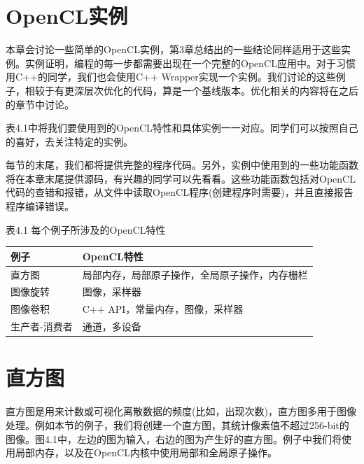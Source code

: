 

\section{OpenCL实例}

本章会讨论一些简单的OpenCL实例，第3章总结出的一些结论同样适用于这些实例。实例证明，编程的每一步都需要出现在一个完整的OpenCL应用中。对于习惯用C++的同学，我们也会使用C++ Wrapper实现一个实例。我们讨论的这些例子，相较于有更深层次优化的代码，算是一个基线版本。优化相关的内容将在之后的章节中讨论。

表4.1中将我们要使用到的OpenCL特性和具体实例一一对应。同学们可以按照自己的喜好，去关注特定的实例。

每节的末尾，我们都将提供完整的程序代码。另外，实例中使用到的一些功能函数将在本章末尾提供源码，有兴趣的同学可以先看看。这些功能函数包括对OpenCL代码的查错和报错，从文件中读取OpenCL程序(创建程序时需要)，并且直接报告程序编译错误。

表4.1 每个例子所涉及的OpenCL特性

\par\medskip\noindent
\begingroup\fontsize{9bp}{12.5bp}\selectfont\renewcommand{\arraystretch}{1.12}
\begin{center}
\begin{tabularx}{\textwidth}{lX}
\toprule
例子 & OpenCL特性 \\
\midrule
直方图 & 局部内存，局部原子操作，全局原子操作，内存栅栏 \\
图像旋转 & 图像，采样器 \\
图像卷积 & C++ API，常量内存，图像，采样器 \\
生产者-消费者 & 通道，多设备 \\
\bottomrule
\end{tabularx}
\end{center}
\endgroup
\medskip



\section{直方图}

直方图是用来计数或可视化离散数据的频度(比如，出现次数)，直方图多用于图像处理。例如本节的例子，我们将创建一个直方图，其统计像素值不超过256-bit的图像。图4.1中，左边的图为输入，右边的图为产生好的直方图。例子中我们将使用局部内存，以及在OpenCL内核中使用局部和全局原子操作。


